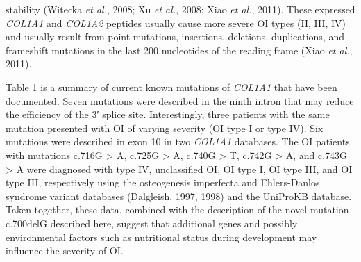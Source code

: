                 stability (Witecka \textit{et al.},
                    2008; Xu \textit{et al.},
                    2008; Xiao \textit{et al.},
                    2011). These expressed \textit{COL1A1} and
                    \textit{COL1A2} peptides usually cause more severe OI types (II, III,
                IV) and usually result from point mutations, insertions, deletions, duplications,
                and frameshift mutations in the last 200 nucleotides of the reading frame (Xiao \textit{et al.}, 2011).\par Table 1 is a summary of current known
                mutations of \textit{COL1A1} that have been documented. Seven mutations were
                described in the ninth intron that may reduce the efficiency of the 3′ splice site.
                Interestingly, three patients with the same mutation presented with OI of varying
                severity (OI type I or type IV). Six mutations were described in exon 10 in two
                    \textit{COL1A1} databases. The OI patients with mutations c.716G
                > A, c.725G > A, c.740G > T, c.742G > A, and c.743G
                > A were diagnosed with type IV, unclassified OI, OI type I, OI type III,
                and OI type III, respectively using the osteogenesis imperfecta and Ehlers-Danlos
                syndrome variant databases (Dalgleish, 1997,
                    1998) and the UniProKB database. Taken
                together, these data, combined with the description of the novel mutation c.700delG
                described here, suggest that additional genes and possibly environmental factors
                such as nutritional status during development may influence the severity of OI.
